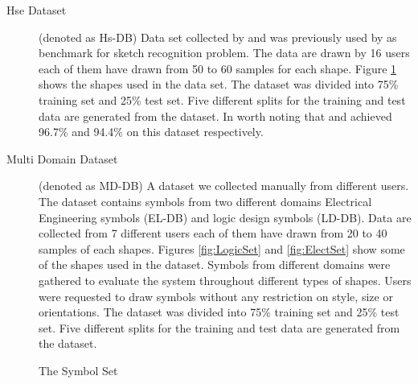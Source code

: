 \begin{description}
	\item [Hse Dataset] (denoted as Hs-DB) Data set collected by \cite{HeloiseBeautification} and was previously used by \cite{Oltmans07} as benchmark for sketch recognition problem. The data are drawn by 16 users each of them have drawn from 50 to 60 samples for each shape. Figure \ref{fig:symbolSet} shows the shapes used in the data set. The dataset was divided into 75\% training set and 25\% test set. Five different splits for the training and test data are generated from the dataset. In worth noting that \cite{HeloiseBeautification} and \cite{Oltmans07} achieved 96.7\% and  94.4\%  on this dataset respectively. %
		\item [Multi Domain Dataset] (denoted as MD-DB) A dataset we collected manually from different users. The dataset contains symbols from two different domains Electrical Engineering symbols (EL-DB) and logic design symbols (LD-DB). Data are collected from 7 different users each of them have drawn from 20 to 40 samples of each shapes. Figures \ref{fig:LogicSet} and \ref{fig:ElectSet} show some of the shapes used in the dataset. Symbols from different domains were gathered to evaluate the system throughout different types of shapes. Users were requested to draw symbols without any restriction on style, size or orientations. The dataset was divided into 75\% training set and 25\% test set. Five different splits for the training and test data are generated from the dataset. %
\end{description}

\begin{figure}[]\centering
{}
	\caption{The Symbol Set}
	\label{fig:symbolSet}
\end{figure}

